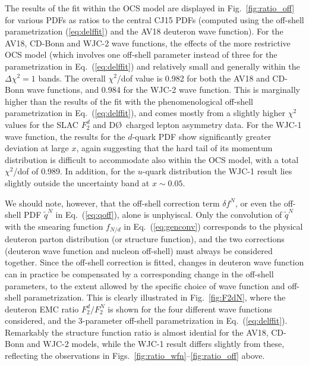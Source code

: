 \documentclass[aps,prd,amsmath,preprint]{revtex4}
\begin{document}
The results of the fit within the OCS model are displayed in
Fig.~\ref{fig:ratio_off} for various PDFs as ratios to the
central CJ15 PDFs (computed using the off-shell parametrization
(\ref{eq:delffit}) and the AV18 deuteron wave function).
For the AV18, CD-Bonn and WJC-2 wave functions, the effects of
the more restrictive OCS model (which involves one off-shell
parameter instead of three for the parametrization in
Eq.~(\ref{eq:delffit}) and relatively small and generally
within the $\Delta\chi^2=1$ bands.
The overall $\chi^2$/dof value is 0.982 for both the AV18 and
CD-Bonn wave functions, and 0.984 for the WJC-2 wave function.
This is marginally higher than the results of the fit with the
phenomenological off-shell parametrization in Eq.~(\ref{eq:delffit}),
and comes mostly from a slightly higher $\chi^2$ values for the
SLAC $F_2^d$ and D\O\ charged lepton asymmetry data.
%
For the WJC-1 wave function, the results for the $d$-quark PDF
show significantly greater deviation at large $x$, again
suggesting that the hard tail of its momentum distribution
is difficult to accommodate also within the OCS model,
with a total $\chi^2$/dof of 0.989.
In addition, for the $u$-quark distribution the WJC-1 result
lies slightly outside the uncertainty band at $x \sim 0.05$.


We should note, however, that the off-shell correction term
$\delta f^N$, or even the off-shell PDF $\widetilde{q}^N$ in
Eq.~(\ref{eq:qoff}), alone is unphyiscal.  Only the convolution
of $\widetilde{q}^N$ with the smearing function $f_{N/d}$ in
Eq.~(\ref{eq:genconv}) corresponds to the physical deuteron
parton distribution (or structure function), and the two
corrections (deuteron wave function and nucleon off-shell)
must always be considered together.
Since the off-shell correction is fitted, changes in deuteron
wave function can in practice be compensated by a corresponding
change in the off-shell parameters, to the extent allowed by the
specific choice of wave function and off-shell parametrization.
This is clearly illustrated in Fig.~\ref{fig:F2dN}, where the
deuteron EMC ratio $F_2^d/F_2^N$ is shown for the four different
wave functions considered, and the 3-parameter off-shell
parametrization in Eq.~(\ref{eq:delffit}).
Remarkably the structure function ratio is almost idential for
the AV18, CD-Bonn and WJC-2 models, while the WJC-1 result
differs slightly from these, reflecting the observations in
Figs.~\ref{fig:ratio_wfn}--\ref{fig:ratio_off} above.
\end{document}
